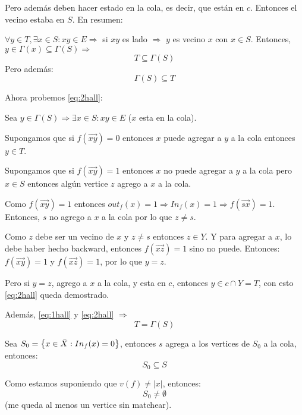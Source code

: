 \documentclass[12pt,a4paper]{article}
\begin{document}
Pero además deben hacer estado en la cola, es decir, que están en $c$. Entonces 
el vecino estaba en $S$. En resumen:
\medskip

$\forall y\in T, \exists x\in S: xy \in E \Rightarrow$ si $xy$ es lado $\Rightarrow$
$y$ es vecino $x$ con $x\in S$. Entonces, $y\in \Gamma(x) \subseteq \Gamma(S) \Rightarrow$
\begin{equation}
    T \subseteq \Gamma(S)
    \label{eq:1hall}
\end{equation}
Pero además:
\begin{equation}
    \Gamma(S) \subseteq T
    \label{eq:2hall}
\end{equation}

Ahora probemos \ref{eq:2hall}:
\medskip

Sea $y\in \Gamma(S) \Rightarrow \exists x\in S: xy\in E$ ($x$ esta en la cola).
\medskip

Supongamos que si $f(\overrightarrow{xy}) = 0$ entonces $x$ puede agregar a $y$ a la 
cola entonces $y \in T$.
\medskip

Supongamos que si $f(\overrightarrow{xy}) = 1$ entonces $x$ no puede agregar a $y$ a la 
cola pero $x\in S$ entonces algún vertice $z$ agrego a $x$ a la cola.
\medskip

Como $f(\overrightarrow{xy}) = 1$ entonces $out_{f}(x)=1 \Rightarrow In_{f}(x)=1 \Rightarrow f(\overrightarrow{sx})=1$.
Entonces, $s$ no agrego a $x$ a la cola por lo que $z \neq s$.
\medskip

Como $z$ debe ser un vecino de $x$ y $z \neq s$ entonces $z \in Y$. Y para agregar a $x$, 
lo debe haber hecho backward, entonces $f(\overrightarrow{xz})=1$ sino no puede. Entonces:
$f(\overrightarrow{xy})=1$ y $f(\overrightarrow{xz}) = 1$, por lo que $y=z$.
\medskip

Pero si $y=z$, agrego a $x$ a la cola, y esta en $c$, entonces $y\in c \cap Y = T$, 
con esto \ref{eq:2hall} queda demostrado.
\medskip

Además, \ref{eq:1hall} y \ref{eq:2hall} $\Rightarrow$ 
\begin{equation}
    T = \Gamma(S)
    \label{eq:3hall}
\end{equation}

Sea $S_{0} = \left\lbrace x\in \bar{X}: In_{f}(x)=0 \right\rbrace$, entonces $s$ agrega a los vertices 
de $S_{0}$ a la cola, entonces:
\begin{equation}
    S_{0} \subseteq S
    \label{eq:4hall}
\end{equation}

Como estamos suponiendo que $v(f) \neq |x|$, entonces:
\begin{equation}
    S_{0} \neq \emptyset
    \label{eq:5hall}
\end{equation}
(me queda al menos un vertice sin matchear).
\medskip
\end{document}
